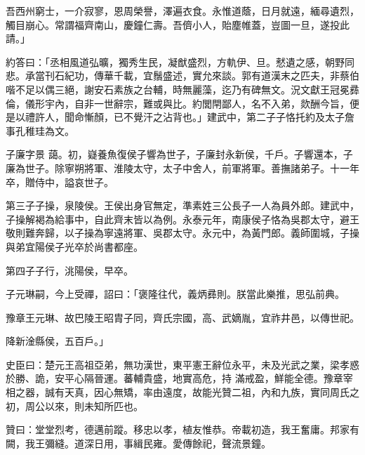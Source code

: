 \begin{pinyinscope}
 吾西州窮士，一介寂寥，恩周榮譽，澤遍衣食。永惟道蔭，日月就遠，緬尋遺烈，觸目崩心。常謂福齊南山，慶鐘仁壽。吾儕小人，貽塵帷蓋，豈圖一旦，遂投此請。」



 約答曰：「丞相風道弘曠，獨秀生民，凝猷盛烈，方軌伊、旦。憖遺之感，朝野同悲。承當刊石紀功，傳華千載，宜鬚盛述，實允來談。郭有道漢末之匹夫，非蔡伯喈不足以偶三絕，謝安石素族之台輔，時無麗藻，迄乃有碑無文。況文獻王冠冕彞倫，儀形宇內，自非一世辭宗，難或與比。約閭閈鄙人，名不入弟，欻酬今旨，便是以禮許人，聞命慚顏，已不覺汗之沾背也。」建武中，第二子子恪托約及太子詹事孔稚珪為文。



 子廉字景
 藹。初，嶷養魚復侯子響為世子，子廉封永新侯，千戶。子響還本，子廉為世子。除寧朔將軍、淮陵太守，太子中舍人，前軍將軍。善撫諸弟子。十一年卒，贈侍中，謚哀世子。



 第三子子操，泉陵侯。王侯出身官無定，準素姓三公長子一人為員外郎。建武中，子操解褐為給事中，自此齊末皆以為例。永泰元年，南康侯子恪為吳郡太守，避王敬則難奔歸，以子操為寧遠將軍、吳郡太守。永元中，為黃門郎。義師圍城，子操與弟宜陽侯子光卒於尚書都座。



 第四子子行，洮陽侯，早卒。



 子元琳嗣，今上受禪，詔曰：「褒隆往代，義炳彞則。朕當此樂推，思弘前典。



 豫章王元琳、故巴陵王昭胄子同，齊氏宗國，高、武嫡胤，宜祚井邑，以傳世祀。



 降新淦縣侯，五百戶。」



 史臣曰：楚元王高祖亞弟，無功漢世，東平憲王辭位永平，未及光武之業，梁孝惑於勝、詭，安平心隔晉運。蕃輔貴盛，地實高危，持
 滿戒盈，鮮能全德。豫章宰相之器，誠有天真，因心無矯，率由遠度，故能光贊二祖，內和九族，實同周氏之初，周公以來，則未知所匹也。



 贊曰：堂堂烈考，德邁前蹤。移忠以孝，植友惟恭。帝載初造，我王奮庸。邦家有闕，我王彌縫。道深日用，事緝民雍。愛傳餘祀，聲流景鐘。



\end{pinyinscope}